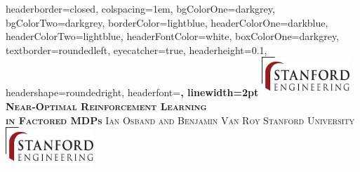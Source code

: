 \documentclass[landscape,a0paper,fontscale=0.285]{baposter} %
\theoremstyle{definition}
\begin{document}
\begin{poster}
{
headerborder=closed, %
colspacing=1em, %
bgColorOne=darkgrey, %
bgColorTwo=darkgrey, %
borderColor=lightblue, %
headerColorOne=darkblue, %
headerColorTwo=lightblue, %
headerFontColor=white, %
boxColorOne=darkgrey, %
textborder=roundedleft, %
eyecatcher=true, %
headerheight=0.1\textheight, %
headershape=roundedright, %
headerfont=\Large\bf\textsc, %
linewidth=2pt %
}
%
{\includegraphics[height=4em]{logo}} %
{\color{white} \bf\textsc{Near-Optimal Reinforcement Learning \\ \vspace{1mm} in Factored MDPs}\vspace{0.5em}} %
{\color{white} \textsc{ Ian Osband and Benjamin Van Roy \hspace{12pt} Stanford University}} %
{\includegraphics[height=4em]{logo}} %


\end{poster}
\end{document}
